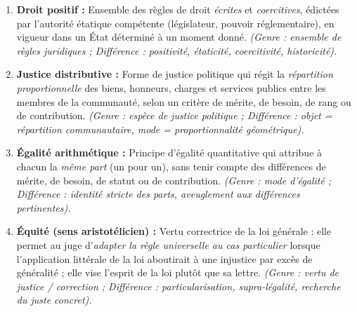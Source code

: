 \documentclass[11pt]{article}
\begin{document}
\begin{corrige}
\begin{enumerate}
\item \textbf{Droit positif :} Ensemble des règles de droit \emph{écrites} et \emph{coercitives}, édictées par l'autorité étatique compétente (législateur, pouvoir réglementaire), en vigueur dans un État déterminé à un moment donné. \textit{(Genre : ensemble de règles juridiques ; Différence : positivité, étaticité, coercitivité, historicité).}
\item \textbf{Justice distributive :} Forme de justice politique qui régit la \emph{répartition proportionnelle} des biens, honneurs, charges et services publics entre les membres de la communauté, selon un critère de mérite, de besoin, de rang ou de contribution. \textit{(Genre : espèce de justice politique ; Différence : objet = répartition communautaire, mode = proportionnalité géométrique).}
\item \textbf{Égalité arithmétique :} Principe d'égalité quantitative qui attribue à chacun la \emph{même part} (un pour un), sans tenir compte des différences de mérite, de besoin, de statut ou de contribution. \textit{(Genre : mode d'égalité ; Différence : identité stricte des parts, aveuglement aux différences pertinentes).}
\item \textbf{Équité (sens aristotélicien) :} Vertu correctrice de la loi générale : elle permet au juge d'\emph{adapter la règle universelle au cas particulier} lorsque l'application littérale de la loi aboutirait à une injustice par excès de généralité ; elle vise l'esprit de la loi plutôt que sa lettre. \textit{(Genre : vertu de justice / correction ; Différence : particularisation, supra-légalité, recherche du juste concret).}
\end{enumerate}
\end{corrige}
\end{document}
